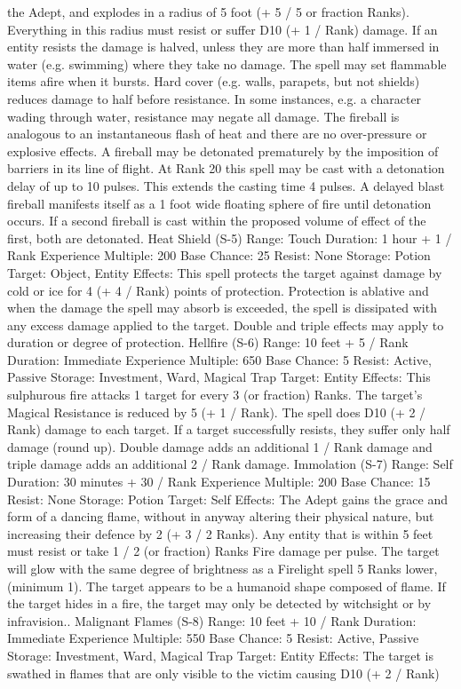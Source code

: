 \documentclass[a4paper]{article}
\begin{document}
\begin{multicols}{3}
the Adept, and explodes in a radius of 5 foot (+ 5 /
5 or fraction Ranks). Everything in this radius must
resist or suffer D10 (+ 1 / Rank) damage. If an
entity resists the damage is halved, unless they are
more than half immersed in water (e.g. swimming)
where they take no damage. The spell may set
flammable items afire when it bursts. Hard cover
(e.g. walls, parapets, but not shields) reduces damage to half before resistance. In some instances,
e.g. a character wading through water, resistance
may negate all damage. The fireball is analogous to
an instantaneous flash of heat and there are no
over-pressure or explosive effects. A fireball may
be detonated prematurely by the imposition of
barriers in its line of flight.
At Rank 20 this spell may be cast with a detonation
delay of up to 10 pulses. This extends the casting
time 4 pulses. A delayed blast fireball manifests
itself as a 1 foot wide floating sphere of fire until
detonation occurs. If a second fireball is cast within
the proposed volume of effect of the first, both are
detonated.
Heat Shield (S-5)
Range: Touch
Duration: 1 hour + 1 / Rank
Experience Multiple: 200
Base Chance: 25%
Resist: None
Storage: Potion
Target: Object, Entity
Effects: This spell protects the target against damage by cold or ice for 4 (+ 4 / Rank) points of
protection. Protection is ablative and when the
damage the spell may absorb is exceeded, the spell
is dissipated with any excess damage applied to the
target. Double and triple effects may apply to duration or degree of protection.
Hellfire (S-6)
Range: 10 feet + 5 / Rank
Duration: Immediate
Experience Multiple: 650
Base Chance: 5%
Resist: Active, Passive
Storage: Investment, Ward, Magical Trap
Target: Entity
Effects: This sulphurous fire attacks 1 target for
every 3 (or fraction) Ranks. The target’s Magical
Resistance is reduced by 5 (+ 1 / Rank). The spell
does D10 (+ 2 / Rank) damage to each target. If a
target successfully resists, they suffer only half
damage (round up). Double damage adds an additional 1 / Rank damage and triple damage adds an
additional 2 / Rank damage.
Immolation (S-7)
Range: Self
Duration: 30 minutes + 30 / Rank
Experience Multiple: 200
Base Chance: 15%
Resist: None
Storage: Potion
Target: Self
Effects: The Adept gains the grace and form of a
dancing flame, without in anyway altering their
physical nature, but increasing their defence by 2
(+ 3 / 2 Ranks). Any entity that is within 5 feet
must resist or take 1 / 2 (or fraction) Ranks Fire
damage per pulse. The target will glow with the
same degree of brightness as a Firelight spell 5
Ranks lower, (minimum 1). The target appears to
be a humanoid shape composed of flame. If the
target hides in a fire, the target may only be detected by witchsight or by infravision..
Malignant Flames (S-8)
Range: 10 feet + 10 / Rank
Duration: Immediate
Experience Multiple: 550
Base Chance: 5%
Resist: Active, Passive
Storage: Investment, Ward, Magical Trap
Target: Entity
Effects: The target is swathed in flames that are
only visible to the victim causing D10 (+ 2 / Rank)


\end{multicols}
\end{document}
